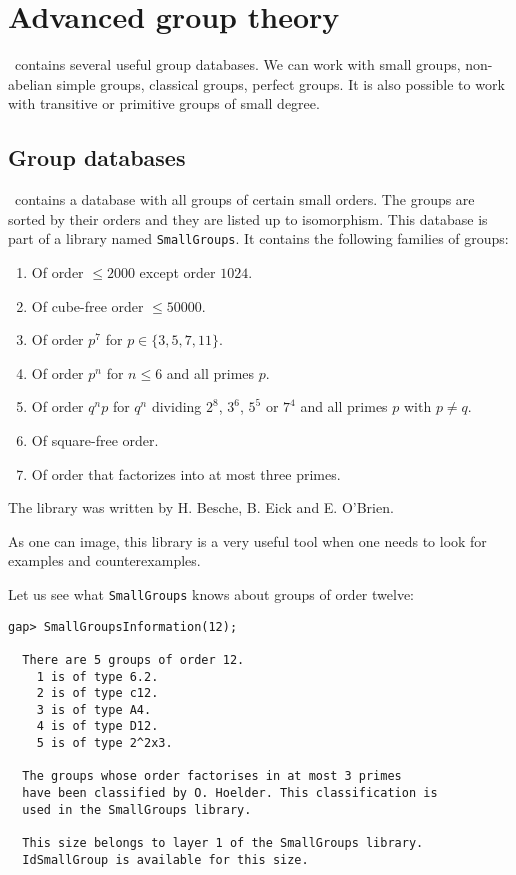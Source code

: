\chapter{Advanced group theory}

\GAP~contains several useful group databases. We 
can work with small groups, 
non-abelian simple groups, classical groups, 
perfect groups. It is also possible to work with transitive or
primitive groups of small degree. 

\section{Group databases}


\GAP~contains a database with all groups of certain small orders. The groups
are sorted by their orders and they are listed up to isomorphism. This database
is part of a library named \lstinline{SmallGroups}. It contains the following
families of groups: 
\begin{enumerate}[label=(\alph*)]
    \item Of order $\leq2000$ except order $1024$. 
    \item Of cube-free order $\leq 50000$.
    \item Of order $p^7$ for $p\in\{3,5,7,11\}$.
    \item Of order $p^n$ for $n\leq 6$ and all primes $p$. 
    \item Of order $q^np$ for $q^n$ dividing $2^8$, $3^6$, $5^5$ or $7^4$ and all     primes $p$ with $p\ne q$. 
    \item Of square-free order.
    \item Of order that factorizes into at most three primes.
\end{enumerate}

The library was written by H. Besche, B. Eick and E. O'Brien.

As one can image, this library is a very useful tool when one needs to look for
examples and counterexamples.  

\begin{example}
Let us see what \lstinline{SmallGroups} knows about groups of order twelve:
\begin{lstlisting}
gap> SmallGroupsInformation(12);                                      

  There are 5 groups of order 12.
    1 is of type 6.2.
    2 is of type c12.
    3 is of type A4.
    4 is of type D12.
    5 is of type 2^2x3.

  The groups whose order factorises in at most 3 primes 
  have been classified by O. Hoelder. This classification is 
  used in the SmallGroups library. 

  This size belongs to layer 1 of the SmallGroups library. 
  IdSmallGroup is available for this size. 
\end{lstlisting}
\end{example}

